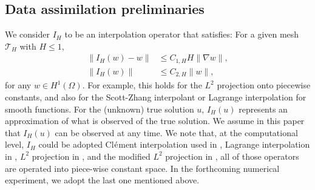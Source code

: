 \documentclass[10pt,twoside,openany,UTF8,CJK]{article}
\begin{document}
    \subsection{Data assimilation preliminaries}
    We consider $I_H$ to be an interpolation operator that satisfies: For a given mesh ${\mathcal{T}_H}$ with $H \leq 1$,
    \begin{align}
    	\left\|I_H(w)-w\right\| & \leq C_{1,H} H\|\nabla w\|, \label{Conv-H} \\ 
    	\left\|I_H(w)\right\| & \leq C_{2,H}\|w\|,  \label{Stab-H}
    \end{align}
    for any $w \in H^1(\Omega)$. For example, this holds for the $L^2$ projection onto piecewise constants, and also for the Scott-Zhang interpolant or Lagrange interpolation for smooth functions. For the (unknown) true solution $u$, $I_H(u)$ represents an approximation of what is observed of the true solution. We assume in this paper that $I_H(u)$ can be observed at any time. We note that, at the computational level, $I_H$ could be adopted Cl$\rm{\acute{e}}$ment interpolation used in \cite{CDA-ACM-2020}, Lagrange interpolation in \cite{CDA-SINUM-2020}, $L^2$ projection in \cite{CDA-VeloVort-2021-ERA}, and the modified $L^2$ projection in \cite{CDA-2021-NMPDE}, all of those operators are operated into piece-wise constant space. In the forthcoming numerical experiment, we adopt the last one mentioned above.
    
    
\end{document}
